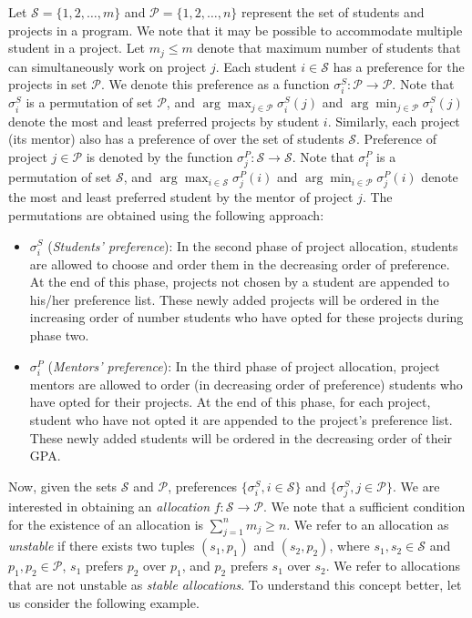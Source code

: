 \documentclass{article}
\begin{document}
Let $\mathcal{S}=\{1,2,\ldots,m\}$ and $\mathcal{P}= \{1,2,\ldots,n\}$ represent the set of students and projects in a program. We note that it may be possible to accommodate multiple student in a project. Let $m_j \leq m$ denote that maximum number of students that can simultaneously work on project $j$. Each student $i \in \mathcal{S}$ has a preference for the projects in set $\mathcal{P}$. We denote this preference as a function $\sigma^S_i: \mathcal{P} \to \mathcal{P}$. Note that $\sigma^S_i$ is a permutation of set $\mathcal{P}$, and $\arg \max_{j \in \mathcal{P}} \sigma^S_i(j)$ and $\arg \min_{j \in \mathcal{P}} \sigma^S_i(j)$ denote the most and least preferred projects by student $i$. Similarly, each project (its mentor) also has a preference of over the set of students $\mathcal{S}$. Preference of project $j \in \mathcal{P}$ is denoted by the function $\sigma^P_j: \mathcal{S} \to \mathcal{S}$. Note that $\sigma^P_i$ is a permutation of set $\mathcal{S}$, and $\arg \max_{i \in \mathcal{S}} \sigma^P_j(i)$ and $\arg \min_{i \in \mathcal{P}} \sigma^P_j(i)$ denote the most and least preferred student by the mentor of project $j$. The permutations are obtained using the following approach: 

\begin{itemize}
	\item $\sigma^S_i$ (\textit{Students' preference}): In the second phase of project allocation, students are allowed to choose and order them in the decreasing order of preference. At the end of this phase, projects not chosen by a student are appended to his/her preference list. These newly added projects will be ordered in the increasing order of number students who have opted for these projects during phase two.
	\item $\sigma^P_i$ (\textit{Mentors' preference}): In the third phase of project allocation, project mentors are allowed to order (in decreasing order of preference) students who have opted for their projects. At the end of this phase, for each project, student who have not opted it are appended to the project's preference list. These newly added students will be ordered in the decreasing order of their GPA.
\end{itemize}


Now, given the sets $\mathcal{S}$ and $\mathcal{P}$, preferences $\{\sigma^{S}_i, i \in \mathcal{S} \}$ and $\{\sigma^{S}_j, j \in \mathcal{P} \}$. We are interested in obtaining an \emph{allocation} $f: \mathcal{S} \to \mathcal{P}$. We note that a sufficient condition for the existence of an allocation is $\sum^n_{j=1} m_j \geq n$.
We refer to an allocation as \textit{unstable} if there exists two tuples $(s_1, p_1)$ and $(s_2, p_2)$, where $s_1,s_2 \in \mathcal{S}$ and $p_1,p_2 \in \mathcal{P}$, $s_1$ prefers $p_2$ over $p_1$, and $p_2$ prefers $s_1$ over $s_2$. We refer to allocations that are not unstable as \textit{stable allocations}. To understand this concept better, let us consider the following example.
\end{document}
